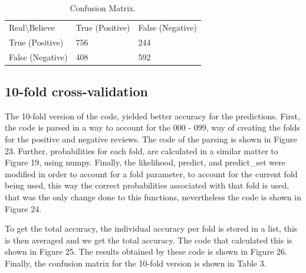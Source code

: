 \documentclass[12pt, letter]{article}
\begin{document}
\begin{table}[]
\centering
\caption{Confusion Matrix.}
\label{my-label}
\begin{tabular}{lll}
Real\textbackslash{}Believe & True (Positive) & False (Negative) \\
True (Positive)             & 756             & 244              \\
False (Negative)            & 408             & 592             
\end{tabular}
\end{table}

\FloatBarrier

\subsection{10-fold cross-validation}

The 10-fold version of the code, yielded better accuracy for the predictions. First, the code is parsed in a way to account for the 000 - 099, way of creating the folds for the positive and negative reviews. The code of the parsing is shown in Figure 23. Further, probabilities for each fold, are calculated in a similar matter to Figure 19, using numpy. Finally, the likelihood, predict, and predict\_set were modified in order to account for a fold parameter, to account for the current fold being used, this way the correct probabilities associated with that fold is used, that was the only change done to this functions, nevertheless the code is shown in Figure 24. 

To get the total accuracy, the individual accuracy per fold is stored in a list, this is then averaged and we get the total accuracy. The code that calculated this is shown in Figure 25. The results obtained by these code is shown in Figure 26. Finally, the confusion matrix for the 10-fold version is shown in Table 3. 
\end{document}
